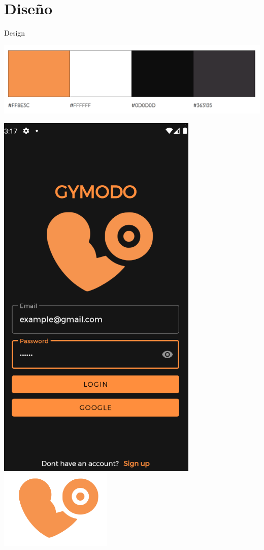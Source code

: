 \documentclass[12pt]{beamer}
\begin{document}
\section{Diseño}
\begin{frame}{Design}

\begin{center}
\includegraphics[width=\textwidth]{color_palette}

\includegraphics[height=0.45\textheight]{loginconcredenciales}
\includegraphics[width=0.4\textwidth]{gymodo_logo}
\end{center}


\end{frame}
\end{document}
